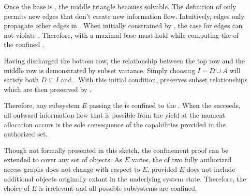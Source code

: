Once the base \TMaccessGraph{} is \TMmaximal{}, the middle triangle becomes solvable.
The definition of \NMagConfined{} only permits new \NMwk{} edges that don't create new information flow.
Intuitively, \NMwk{} edges only propagate other \NMwk{} edges in \NMtransfer{}.
When initially constrained by \NMagConfined{}, the \NMtransfer{} case for \NMwk{} edges can not violate \NMagConfined{}.
Therefore, \NMagConfined{} with a maximal base \TMaccessGraph{} must hold while computing the \TMpotAcc{} of the confined \TMaccessGraph{}.

Having discharged the bottom row, the relationship between the top row and the middle row is demonstrated by subset variance.
Simply choosing \(I = D \cup A\) will satisfy both \(D \subseteq I\) and .
With this initial condition, \NMpotAcc{} preserves subset relationships which are then preserved by \NMmutable{}.

Therefore, any subsystem \(E\) passing the \TMconfinementTest{} is confined to the \TMfullAuthAG{}.
When the \TMconfinementTest{} succeeds, all outward information flow that is possible from the yield at the moment allocation occurs is the sole consequence of the capabilities provided in the authorized set.

Though not formally presented in this sketch, the confinement proof can be extended to cover any set of objects.
As \(E\) varies, the \TMmutability{} of two fully authorized access graphs does not change with respect to \(E\), provided \(E\) does not include additional objects originally extant in the underlying system state.
Therefore, the choice of \(E\) is irrelevant and all possible subsystems are confined.



